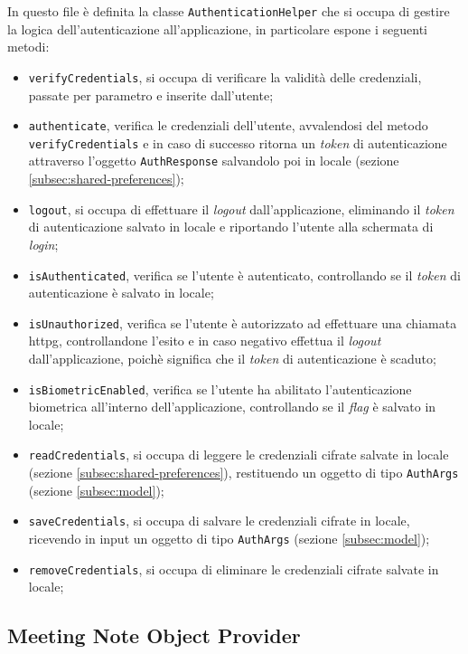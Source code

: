 In questo file è definita la classe \lstinline{AuthenticationHelper} che si occupa di gestire la logica dell'autenticazione all'applicazione, in particolare espone i seguenti metodi:
\begin{itemize}
    \item \lstinline{verifyCredentials}, si occupa di verificare la validità delle credenziali, passate per parametro e inserite dall'utente;
    \item \lstinline{authenticate}, verifica le credenziali dell'utente, avvalendosi del metodo \lstinline{verifyCredentials} e in caso di successo ritorna un \emph{token} di autenticazione attraverso l'oggetto \lstinline{AuthResponse} salvandolo poi in locale (sezione \ref{subsec:shared-preferences});
    \item \lstinline{logout}, si occupa di effettuare il \emph{logout} dall'applicazione, eliminando il \emph{token} di autenticazione salvato in locale e riportando l'utente alla schermata di \emph{login};
    \item \lstinline{isAuthenticated}, verifica se l'utente è autenticato, controllando se il \emph{token} di autenticazione è salvato in locale;
    \item \lstinline{isUnauthorized}, verifica se l'utente è autorizzato ad effettuare una chiamata \gls{httpg}\glsoccur, controllandone l'esito e in caso negativo effettua il \emph{logout} dall'applicazione, poichè significa che il \emph{token} di autenticazione è scaduto;
    \item \lstinline{isBiometricEnabled}, verifica se l'utente ha abilitato l'autenticazione biometrica all'interno dell'applicazione, controllando se il \emph{flag} è salvato in locale;
    \item \lstinline{readCredentials}, si occupa di leggere le credenziali cifrate salvate in locale (sezione \ref{subsec:shared-preferences}), restituendo un oggetto di tipo \lstinline{AuthArgs} (sezione \ref{subsec:model});
    \item \lstinline{saveCredentials}, si occupa di salvare le credenziali cifrate in locale, ricevendo in input un oggetto di tipo \lstinline{AuthArgs} (sezione \ref{subsec:model});
    \item \lstinline{removeCredentials}, si occupa di eliminare le credenziali cifrate salvate in locale;
\end{itemize}

\subsection{Meeting Note Object Provider}
\label{subsec:meeting-note-object-provider}

